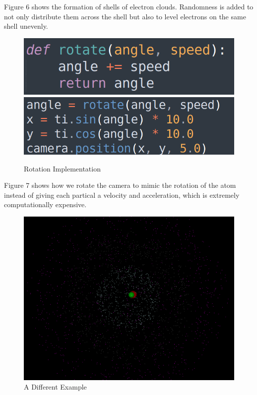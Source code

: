 \documentclass[acmtog]{acmart}
\begin{document}
Figure 6 shows the formation of shells of electron clouds. Randomness is added to not only distribute them across the shell but also to level electrons on the same shell unevenly.

\begin{figure}[h]
  \centering
  \includegraphics[width=\linewidth]{./rotate.png}
  \includegraphics[width=\linewidth]{./camera.png}
  \caption{Rotation Implementation}
\end{figure}

Figure 7 shows how we rotate the camera to mimic the rotation of the atom instead of giving each partical a velocity and acceleration, which is extremely computationally expensive.

\begin{figure}[h]
  \centering
  \includegraphics[width=\linewidth]{./example.png}
  \caption{A Different Example}
\end{figure}
\end{document}

